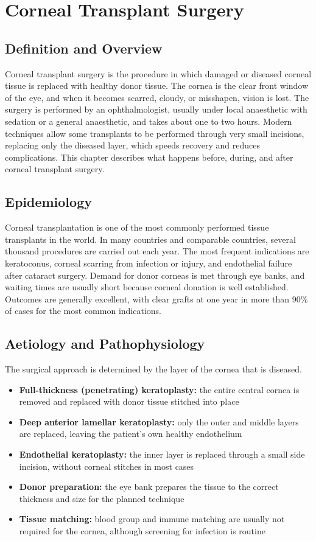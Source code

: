 \chapter{Corneal Transplant Surgery}

\section*{Definition and Overview}
Corneal transplant surgery is the procedure in which damaged or diseased corneal tissue is replaced with healthy donor tissue. The cornea is the clear front window of the eye, and when it becomes scarred, cloudy, or misshapen, vision is lost. The surgery is performed by an ophthalmologist, usually under local anaesthetic with sedation or a general anaesthetic, and takes about one to two hours. Modern techniques allow some transplants to be performed through very small incisions, replacing only the diseased layer, which speeds recovery and reduces complications. This chapter describes what happens before, during, and after corneal transplant surgery.

\section*{Epidemiology}
Corneal transplantation is one of the most commonly performed tissue transplants in the world. In many countries and comparable countries, several thousand procedures are carried out each year. The most frequent indications are keratoconus, corneal scarring from infection or injury, and endothelial failure after cataract surgery. Demand for donor corneas is met through eye banks, and waiting times are usually short because corneal donation is well established. Outcomes are generally excellent, with clear grafts at one year in more than 90\% of cases for the most common indications.

\section*{Aetiology and Pathophysiology}
The surgical approach is determined by the layer of the cornea that is diseased.

\begin{itemize}
    \item \textbf{Full-thickness (penetrating) keratoplasty:} the entire central cornea is removed and replaced with donor tissue stitched into place
    \item \textbf{Deep anterior lamellar keratoplasty:} only the outer and middle layers are replaced, leaving the patient's own healthy endothelium
    \item \textbf{Endothelial keratoplasty:} the inner layer is replaced through a small side incision, without corneal stitches in most cases
    \item \textbf{Donor preparation:} the eye bank prepares the tissue to the correct thickness and size for the planned technique
    \item \textbf{Tissue matching:} blood group and immune matching are usually not required for the cornea, although screening for infection is routine
\end{itemize}

